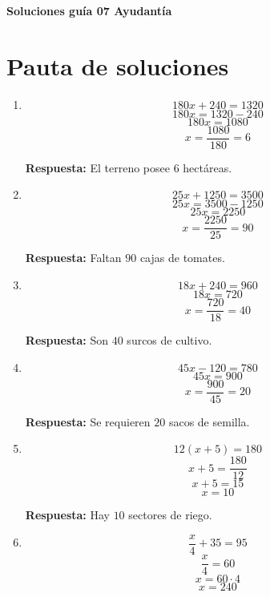 \documentclass[11pt]{article}
\begin{document}
	
\vspace*{0.5em}
	
	\begin{center}
		{\Large \textbf{Soluciones guía 07 Ayudantía}}\\[0.3em]
		
	\end{center}
	
	\vspace{0.2cm}
	

\section*{Pauta de soluciones}

\begin{enumerate}[label=\textbf{\arabic*.}]
	
	\item 
	\[
	180x+240=1320
	\]
	\[
	180x=1320-240
	\]
	\[
	180x=1080
	\]
	\[
	x=\frac{1080}{180}=6
	\]
	
	\textbf{Respuesta:} El terreno posee \(6\) hectáreas.
	
	\item 
	\[
	25x+1250=3500
	\]
	\[
	25x=3500-1250
	\]
	\[
	25x=2250
	\]
	\[
	x=\frac{2250}{25}=90
	\]
	
	\textbf{Respuesta:} Faltan \(90\) cajas de tomates.
	
	\item 
	\[
	18x+240=960
	\]
	\[
	18x=720
	\]
	\[
	x=\frac{720}{18}=40
	\]
	
	\textbf{Respuesta:} Son \(40\) surcos de cultivo.
	
	\item 
	\[
	45x-120=780
	\]
	\[
	45x=900
	\]
	\[
	x=\frac{900}{45}=20
	\]
	
	\textbf{Respuesta:} Se requieren \(20\) sacos de semilla.
	
	\item 
	\[
	12(x+5)=180
	\]
	\[
	x+5=\frac{180}{12}
	\]
	\[
	x+5=15
	\]
	\[
	x=10
	\]
	
	\textbf{Respuesta:} Hay \(10\) sectores de riego.
	
	\newpage
	\vspace*{0.2cm}
	\item 
	\[
	\frac{x}{4}+35=95
	\]
	\[
	\frac{x}{4}=60
	\]
	\[
	x=60\cdot 4
	\]
	\[
	x=240
	\]
	

\end{enumerate}
\end{document}
